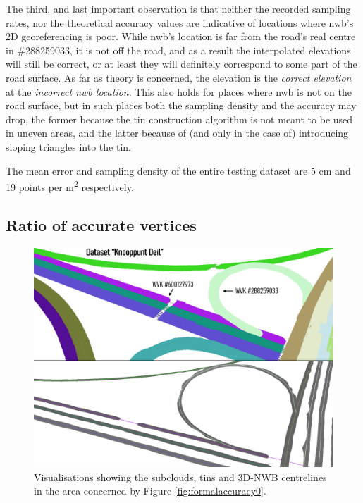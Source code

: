 The third, and last important observation is that neither the recorded sampling rates, nor the theoretical accuracy values are indicative of locations where \ac{nwb}'s 2D georeferencing is poor. While \ac{nwb}'s location is far from the road's real centre in \#288259033, it is not off the road, and as a result the interpolated elevations will still be correct, or at least they will definitely correspond to some part of the road surface. As far as theory is concerned, the elevation is the \textit{correct elevation} at the \textit{incorrect \ac{nwb} location}. This also holds for places where \ac{nwb} is not on the road surface, but in such places both the sampling density and the accuracy may drop, the former because the \ac{tin} construction algorithm is not meant to be used in uneven areas, and the latter because of (and only in the case of) introducing sloping triangles into the \ac{tin}.

The mean error and sampling density of the entire testing dataset are 5 cm and 19 points per m\textsuperscript{2} respectively.

\subsection{Ratio of accurate vertices}
\label{sub:completeness}

\begin{figure}
    \centering
    \includegraphics[width=0.9\linewidth]{final_report/figs/formalaccuracy1.png}
    \caption{Visualisations showing the subclouds, \ac{tin}s and 3D-NWB centrelines in the area concerned by Figure \ref{fig:formalaccuracy0}.}
    \label{fig:formalaccuracy1}
\end{figure}

